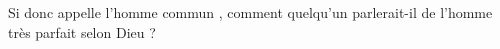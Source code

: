 Si donc  appelle l'homme commun , comment quelqu'un parlerait-il de l'homme très parfait selon Dieu ?
\pend
%
%
